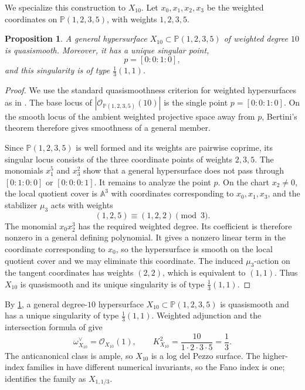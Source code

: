 \documentclass[11pt]{article}
\theoremstyle{plain}
\newtheorem{proposition}[proposition]{Proposition}
\theoremstyle{definition}
\theoremstyle{remark}
\newcommand{\A}{\mathbb A}
\newcommand{\Pp}{\mathbb P}
\newcommand{\OO}{\mathcal O}
\begin{document}
We specialize this construction to \(X_{10}\). Let \(x_0,x_1,x_2,x_3\) be the weighted coordinates on \(\Pp(1,2,3,5)\), with weights \(1,2,3,5\).

\begin{proposition}\label{prop:X10-quasismooth}
A general hypersurface \(X_{10}\subset \Pp(1,2,3,5)\) of weighted degree \(10\) is quasismooth. Moreover, it has a unique singular point,
\[
p=[0:0:1:0],
\]
and this singularity is of type \(\frac13(1,1)\).
\end{proposition}

\begin{proof}
We use the standard quasismoothness criterion for weighted hypersurfaces as in \cite{IanoFletcher2000}. The base locus of \(|\OO_{\Pp(1,2,3,5)}(10)|\) is the single point \(p=[0:0:1:0]\). On the smooth locus of the ambient weighted projective space away from \(p\), Bertini's theorem therefore gives smoothness of a general member.

Since \(\Pp(1,2,3,5)\) is well formed and its weights are pairwise coprime, its singular locus consists of the three coordinate points of weights \(2,3,5\). The monomials \(x_1^5\) and \(x_3^2\) show that a general hypersurface does not pass through \([0:1:0:0]\) or \([0:0:0:1]\). It remains to analyze the point \(p\). On the chart \(x_2\neq0\), the local quotient cover is \(\A^3\) with coordinates corresponding to \(x_0,x_1,x_3\), and the stabilizer \(\mu_3\) acts with weights
\[
(1,2,5)\equiv(1,2,2)\pmod 3.
\]
The monomial \(x_0x_2^3\) has the required weighted degree.
Its coefficient is therefore nonzero in a general defining polynomial. It gives a nonzero linear term in the coordinate corresponding to \(x_0\), so the hypersurface is smooth on the local quotient cover and we may eliminate this coordinate. The induced \(\mu_3\)-action on the tangent coordinates has weights \((2,2)\), which is equivalent to \((1,1)\). Thus \(X_{10}\) is quasismooth and its unique singularity is of type \(\frac13(1,1)\).
\end{proof}

By \cref{prop:X10-quasismooth}, a general degree-\(10\) hypersurface
\(X_{10}\subset\Pp(1,2,3,5)\) is quasismooth and has a unique singularity
of type \(\frac13(1,1)\). Weighted adjunction and the intersection formula
of \cite{Dolgachev1982} give
\[
\omega_{X_{10}}^\vee=\OO_{X_{10}}(1),
\qquad
K_{X_{10}}^2=\frac{10}{1\cdot2\cdot3\cdot5}=\frac13.
\]
The anticanonical class is ample, so \(X_{10}\) is a log del Pezzo surface.
The higher-index families in \cite[Theorem~3]{Corti2016} have different
numerical invariants, so the Fano index is one;
\cite[Theorem~4 and Table~2]{Corti2016} identifies the family as
\(X_{1,1/3}\).
\end{document}
